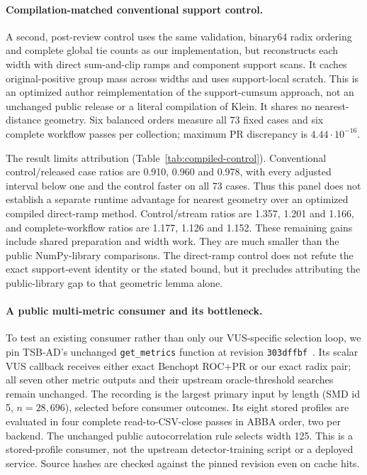 \paragraph{Compilation-matched conventional support control.}
A second, post-review control uses the same validation, binary64 radix ordering
and complete global tie counts as our implementation, but reconstructs each
width with direct sum-and-clip ramps and component support scans. It caches
original-positive group mass across widths and uses support-local scratch.
This is an optimized author reimplementation of the support-cumsum approach,
not an unchanged public release or a literal compilation of Klein. It shares
no nearest-distance geometry. Six balanced orders measure all 73 fixed cases
and six complete workflow passes per collection; maximum PR discrepancy is
$4.44\cdot10^{-16}$.

The result limits attribution (Table~\ref{tab:compiled-control}). Conventional
control/released case ratios are 0.910, 0.960 and 0.978, with every adjusted
interval below one and the control faster on all 73 cases. Thus this panel
does not establish a separate runtime advantage for nearest geometry over an
optimized compiled direct-ramp method. Control/stream ratios are 1.357, 1.201
and 1.166, and complete-workflow ratios are 1.177, 1.126 and 1.152. These
remaining gains include shared preparation and width work. They are much
smaller than the public NumPy-library comparisons. The direct-ramp control
does not refute the exact support-event identity or the stated bound, but it
precludes attributing the public-library gap to that geometric lemma alone.

\paragraph{A public multi-metric consumer and its bottleneck.}
To test an existing consumer rather than only our VUS-specific selection loop,
we pin TSB-AD's unchanged \texttt{get\_metrics} function at revision
\texttt{303dffbf}~\cite{tsbad}. Its scalar VUS callback receives either exact
Benchopt ROC+PR or our exact radix pair; all seven other metric outputs and
their upstream oracle-threshold searches remain unchanged. The recording is
the largest primary input by length (SMD id 5, $n=28{,}696$), selected before
consumer outcomes. Its eight stored profiles are evaluated in four complete
read-to-CSV-close passes in ABBA order, two per backend. The unchanged public
autocorrelation rule selects width 125. This is a stored-profile consumer,
not the upstream detector-training script or a deployed service. Source hashes
are checked against the pinned revision even on cache hits.

